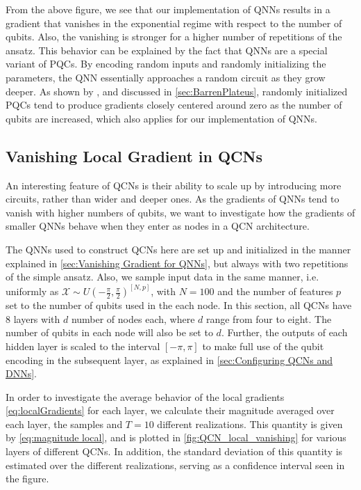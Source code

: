 From the above figure, we see that our implementation of QNNs results in a gradient that vanishes in the exponential regime with respect to the number of qubits. Also, the vanishing is stronger for a higher number of repetitions of the ansatz. This behavior can be explained by the fact that QNNs are a special variant of PQCs. By encoding random inputs and randomly initializing the parameters, the QNN essentially approaches a random circuit as they grow deeper. As shown by \citet{McClean_2018}, and discussed in \autoref{sec:BarrenPlateus}, randomly initialized PQCs tend to produce gradients closely centered around zero as the number of qubits are increased, which also applies for our implementation of QNNs.   

\subsection{Vanishing Local Gradient in QCNs}\label{sec:Vanishing Local Gradients in QCNs}

An interesting feature of QCNs is their ability to scale up by introducing more circuits, rather than wider and deeper ones. As the gradients of QNNs tend to vanish with higher numbers of qubits, we want to investigate how the gradients of smaller QNNs behave when they enter as nodes in a QCN architecture.

The QNNs used to construct QCNs here are set up and initialized in the manner explained in \autoref{sec:Vanishing Gradient for QNNs}, but always with two repetitions of the simple ansatz. Also, we sample input data in the same manner, i.e. uniformly as $\mathcal{X} \sim U(-\frac{\pi}{2}, \frac{\pi}{2})^{[N,p]}$, with $N=100$ and the number of features $p$ set to the number of qubits used in the each node. In this section, all QCNs have 8 layers with $d$ number of nodes each,  where $d$ range from four to eight. The number of qubits in each node will also be set to $d$. Further, the outputs of each hidden layer is scaled to the interval $[-\pi, \pi]$ to make full use of the qubit encoding in the subsequent layer, as explained in \autoref{sec:Configuring QCNs and DNNs}.

In order to investigate the average behavior of the local gradients \autoref{eq:localGradients} for each layer, we calculate their magnitude averaged over each layer, the samples and $T = 10$ different realizations. This quantity is given by \autoref{eq:magnitude local}, and is plotted in \autoref{fig:QCN_local_vanishing} for various layers of different QCNs. In addition, the standard deviation of this quantity is estimated over the different realizations, serving as a confidence interval seen in the figure. 

